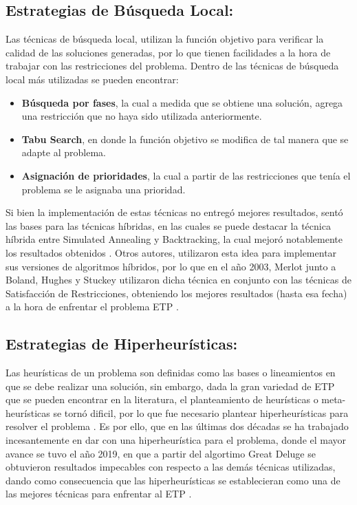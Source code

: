 \documentclass[letter, 10pt]{article}
\begin{document}
\subsection{Estrategias de Búsqueda Local:}
Las técnicas de búsqueda local, utilizan la función objetivo para verificar la calidad de las soluciones generadas, por lo que tienen facilidades a la hora de trabajar con las restricciones del problema. Dentro de las técnicas de búsqueda local más utilizadas se pueden encontrar:
\begin{itemize}
    \item \textbf{Búsqueda por fases}, la cual a medida que se obtiene una solución, agrega una restricción que no haya sido utilizada anteriormente.
    \item \textbf{Tabu Search}, en donde la función objetivo se modifica de tal manera que se adapte al problema.
    \item \textbf{Asignación de prioridades}, la cual a partir de las restricciones que tenía el problema se le asignaba una prioridad.
\end{itemize}
Si bien la implementación de estas técnicas no entregó mejores resultados, sentó las bases para las técnicas híbridas, en las cuales se puede destacar la técnica híbrida entre Simulated Annealing y Backtracking, la cual mejoró notablemente los resultados obtenidos \cite{Cita18}. Otros autores, utilizaron esta idea para implementar sus versiones de algoritmos híbridos, por lo que en el año 2003, Merlot junto a Boland, Hughes y Stuckey utilizaron dicha técnica en conjunto con las técnicas de Satisfacción de Restricciones, obteniendo los mejores resultados (hasta esa fecha) a la hora de enfrentar el problema ETP \cite{Cita19}.

\subsection{Estrategias de Hiperheurísticas:}
Las heurísticas de un problema son definidas como las bases o lineamientos en que se debe realizar una solución, sin embargo, dada la gran variedad de ETP que se pueden encontrar en la literatura, el planteamiento de heurísticas o meta-heurísticas se tornó dificil, por lo que fue necesario plantear hiperheurísticas para resolver el problema \cite{Cita23}. Es por ello, que en las últimas dos décadas se ha trabajado incesantemente en dar con una hiperheurística para el problema, donde el mayor avance se tuvo el año 2019, en que a partir del algortimo Great Deluge se obtuvieron resultados impecables con respecto a las demás técnicas utilizadas, dando como consecuencia que las hiperheurísticas se establecieran como una de las mejores técnicas para enfrentar al ETP \cite{Cita1}.
\end{document}
